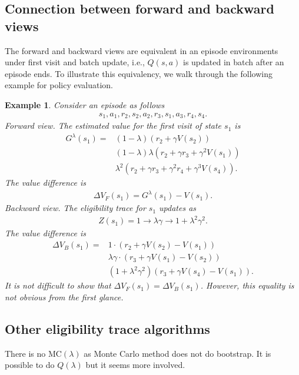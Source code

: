 \documentclass[onecolumn, 12pt]{IEEEtran}
\newcommand\1[1]{\mathbb{I}_{\left\{#1\right\}}}
\newtheorem{example}{Example}
\begin{document}
\subsection{Connection between forward and backward views}
The forward and backward views are equivalent in an episode environments under first visit and batch update, i.e., $Q(s, a)$ is updated in batch after an episode ends. To illustrate this equivalency, we walk through the following example for policy evaluation.
\begin{example}
  Consider an episode as follows
  \begin{align*}
    s_1, a_1, r_2, s_2, a_2, r_3, s_1, a_3, r_4, s_4.
  \end{align*}
  Forward view. The estimated value for the first visit of state $s_1$ is
  \begin{align*}
    G^\lambda(s_1) =& (1 - \lambda) (r_2 + \gamma V(s_2)) \\
    & (1-\lambda) \lambda (r_2 + \gamma r_3  + \gamma^2 V(s_1))\\
    & \lambda^2(r_2 + \gamma r_3 + \gamma^2 r_4 + \gamma^3 V(s_4)).
  \end{align*}
  The value difference is
  \begin{align*}
    \Delta V_F(s_1) = G^\lambda(s_1) - V(s_1).
  \end{align*}
  Backward view. The eligibility trace for $s_1$ updates as
  \begin{align*}
    Z(s_1) = 1 \rightarrow \lambda\gamma \rightarrow 1 + \lambda^2\gamma^2.
  \end{align*}
  The value difference is
  \begin{align*}
    \Delta V_B(s_1) =& 1\cdot (r_2 + \gamma V(s_2) - V(s_1)) \\
    & \lambda\gamma \cdot (r_3 + \gamma V(s_1) - V(s_2))\\
    & (1 + \lambda^2\gamma^2)(r_3 + \gamma V(s_4) - V(s_1)).
  \end{align*}
  It is not difficult to show that $\Delta V_F(s_1) = \Delta V_B(s_1)$. However, this equality is not obvious from the first glance.
\end{example}

\subsection{Other eligibility trace algorithms}
There is no $\text{MC}(\lambda)$ as Monte Carlo method does not do bootstrap. It is possible to do $Q(\lambda)$ but it seems more involved. 
\end{document}
